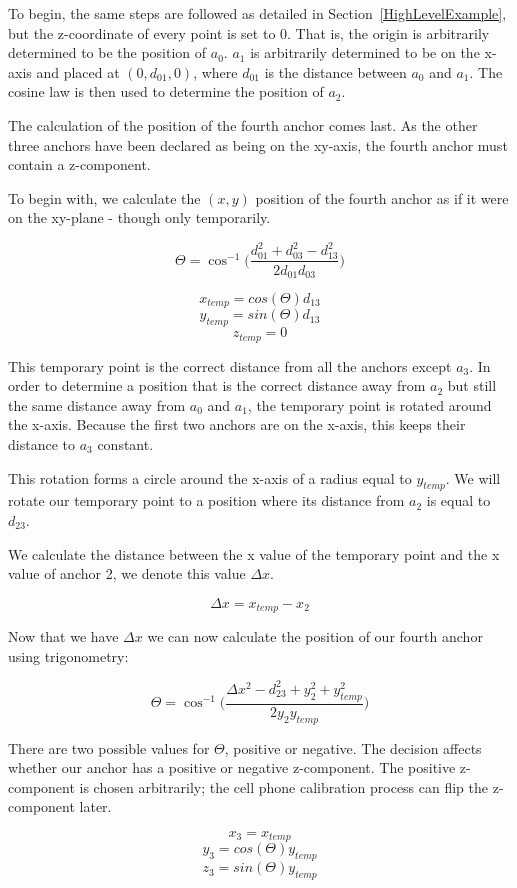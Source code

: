 To begin, the same steps are followed as detailed in Section~\ref{HighLevelExample}, but the z-coordinate of every point is set to 0. That is, the origin is arbitrarily determined to be the position of $a_{0}$. $a_{1}$ is arbitrarily determined to be on the x-axis and placed at $(0, d_{01}, 0)$, where $d_{01}$ is the distance between $a_{0}$ and $a_{1}$. The cosine law is then used to determine the position of $a_{2}$.

The calculation of the position of the fourth anchor comes last. As the other three anchors have been declared as being on the xy-axis, the fourth anchor must contain a z-component.

To begin with, we calculate the $(x, y)$ position of the fourth anchor as if it were on the xy-plane - though only temporarily.

\[ \Theta = \cos ^{ - 1}\Big(\frac{d_{01}^2 + d_{03}^2 - d_{13}^2 }{2 d_{01} d_{03}}\Big)\]

\[ x_{temp} = cos(\Theta) d_{13} \]
\[ y_{temp} = sin(\Theta) d_{13} \]
\[ z_{temp} = 0 \]

This temporary point is the correct distance from all the anchors except $a_3$. In order to determine a position that is the correct distance away from $a_2$ but still the same distance away from $a_0$ and $a_1$, the temporary point is rotated around the x-axis. Because the first two anchors are on the x-axis, this keeps their distance to $a_3$ constant.

This rotation forms a circle around the x-axis of a radius equal to $y_{temp}$. We will rotate our temporary point to a position where its distance from $a_2$ is equal to $d_{23}$.

We calculate the distance between the x value of the temporary point and the x value of anchor 2, we denote this value $\Delta x$.

\[ \Delta x = x_{temp} - x_{2} \]

Now that we have $\Delta x$ we can now calculate the position of our fourth anchor using trigonometry:

\[\Theta = \cos ^{ - 1}\Big(\frac {\Delta x^2 - d_{23}^2 + y_{2}^2 + y_{temp}^2}{2 y_{2} y_{temp}}\Big)\]

There are two possible values for $\Theta$, positive or negative. The decision affects whether our anchor has a positive or negative z-component. The positive z-component is chosen arbitrarily; the cell phone calibration process can flip the z-component later.

\[ x_{3} = x_{temp} \]
\[ y_{3} = cos(\Theta) y_{temp} \]
\[ z_{3} = sin(\Theta) y_{temp} \]

